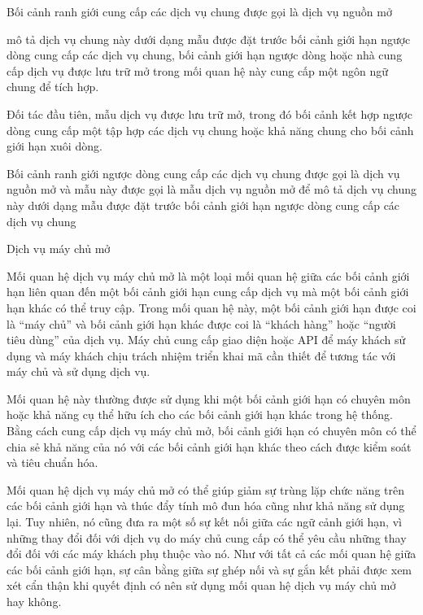 
Bối cảnh ranh giới cung cấp các dịch vụ chung được gọi là dịch vụ nguồn mở

mô tả dịch vụ chung này dưới dạng mẫu được đặt trước bối cảnh giới hạn ngược dòng cung cấp các dịch vụ chung, bối cảnh giới hạn ngược dòng hoặc nhà cung cấp dịch vụ được lưu trữ mở trong mối quan hệ này cung cấp một ngôn ngữ chung để tích hợp.

Đối tác đầu tiên, mẫu dịch vụ được lưu trữ mở, trong đó bối cảnh kết hợp ngược dòng cung cấp một tập hợp các dịch vụ chung hoặc khả năng chung cho bối cảnh giới hạn xuôi dòng.

 

Bối cảnh ranh giới ngược dòng cung cấp các dịch vụ chung được gọi là dịch vụ nguồn mở 
và mẫu này được gọi là mẫu dịch vụ nguồn mở để 
mô tả dịch vụ chung này dưới dạng mẫu được đặt trước bối cảnh giới hạn ngược dòng cung cấp các dịch vụ chung






 

Dịch vụ máy chủ mở

Mối quan hệ dịch vụ máy chủ mở là một loại mối quan hệ giữa các bối cảnh giới hạn liên quan đến một bối cảnh giới hạn cung cấp dịch vụ mà một bối cảnh giới hạn khác có thể truy cập. Trong mối quan hệ này, một bối cảnh giới hạn được coi là “máy chủ” và bối cảnh giới hạn khác được coi là “khách hàng” hoặc “người tiêu dùng” của dịch vụ. Máy chủ cung cấp giao diện hoặc API để máy khách sử dụng và máy khách chịu trách nhiệm triển khai mã cần thiết để tương tác với máy chủ và sử dụng dịch vụ.

Mối quan hệ này thường được sử dụng khi một bối cảnh giới hạn có chuyên môn hoặc khả năng cụ thể hữu ích cho các bối cảnh giới hạn khác trong hệ thống. Bằng cách cung cấp dịch vụ máy chủ mở, bối cảnh giới hạn có chuyên môn có thể chia sẻ khả năng của nó với các bối cảnh giới hạn khác theo cách được kiểm soát và tiêu chuẩn hóa.

Mối quan hệ dịch vụ máy chủ mở có thể giúp giảm sự trùng lặp chức năng trên các bối cảnh giới hạn và thúc đẩy tính mô đun hóa cũng như khả năng sử dụng lại. Tuy nhiên, nó cũng đưa ra một số sự kết nối giữa các ngữ cảnh giới hạn, vì những thay đổi đối với dịch vụ do máy chủ cung cấp có thể yêu cầu những thay đổi đối với các máy khách phụ thuộc vào nó. Như với tất cả các mối quan hệ giữa các bối cảnh giới hạn, sự cân bằng giữa sự ghép nối và sự gắn kết phải được xem xét cẩn thận khi quyết định có nên sử dụng mối quan hệ dịch vụ máy chủ mở hay không.

